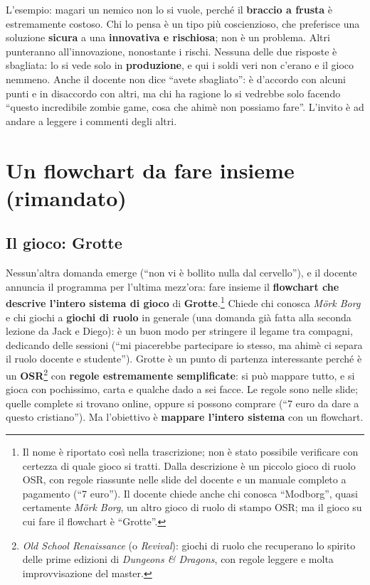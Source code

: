 L'esempio: magari un nemico non lo si vuole, perché il \textbf{braccio a
frusta} è estremamente costoso. Chi lo pensa è un tipo più coscienzioso, che
preferisce una soluzione \textbf{sicura} a una \textbf{innovativa e
rischiosa}; non è un problema. Altri punteranno all'innovazione, nonostante
i rischi. Nessuna delle due risposte è sbagliata: lo si vede solo in
\textbf{produzione}, e qui i soldi veri non c'erano e il gioco nemmeno. Anche
il docente non dice ``avete sbagliato'': è d'accordo con alcuni punti e in
disaccordo con altri, ma chi ha ragione lo si vedrebbe solo facendo
``questo incredibile zombie game, cosa che ahimè non possiamo fare''.
L'invito è ad andare a leggere i commenti degli altri.

\section{Un flowchart da fare insieme (rimandato)}
\label{gd15:sec:flowchart}

\subsection{Il gioco: Grotte}

Nessun'altra domanda emerge (``non vi è bollito nulla dal cervello''), e il
docente annuncia il programma per l'ultima mezz'ora: fare insieme il
\textbf{flowchart che descrive l'intero sistema di gioco} di
\textbf{Grotte}.\footnote{Il nome è riportato così nella trascrizione; non
è stato possibile verificare con certezza di quale gioco si tratti. Dalla
descrizione è un piccolo gioco di ruolo OSR, con regole riassunte nelle slide
del docente e un manuale completo a pagamento (``7 euro''). Il docente
chiede anche chi conosca ``Modborg'', quasi certamente \emph{Mörk Borg},
un altro gioco di ruolo di stampo OSR; ma il gioco su cui fare il flowchart
è ``Grotte''.} Chiede chi conosca \emph{Mörk Borg} e chi giochi a
\textbf{giochi di ruolo} in generale (una domanda già fatta alla seconda
lezione da Jack e Diego): è un buon modo per stringere il legame tra
compagni, dedicando delle sessioni (``mi piacerebbe partecipare io stesso,
ma ahimè ci separa il ruolo docente e studente''). Grotte è un punto di
partenza interessante perché è un \textbf{OSR}\footnote{\emph{Old School
Renaissance} (o \emph{Revival}): giochi di ruolo che recuperano lo spirito
delle prime edizioni di \emph{Dungeons \& Dragons}, con regole leggere e
molta improvvisazione del master.} con \textbf{regole estremamente
semplificate}: si può mappare tutto, e si gioca con pochissimo, carta e
qualche dado a sei facce. Le regole sono nelle slide; quelle complete si
trovano online, oppure si possono comprare (``7 euro da dare a questo
cristiano''). Ma l'obiettivo è \textbf{mappare l'intero sistema} con un
flowchart.

